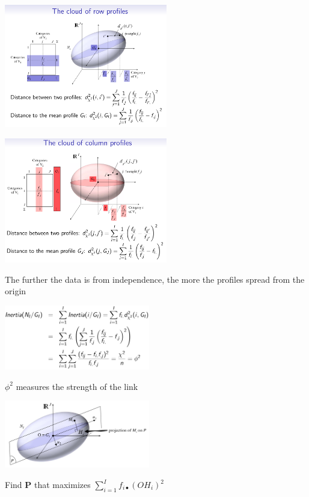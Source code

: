 \documentclass[10pt,landscape]{article}
\begin{document}
\begin{multicols*}{3}
\begin{minipage}{\linewidth}
    \centering
            \includegraphics[width=2.8in]{cloud_of_row_profiles.png}
        \end{minipage}
        
\begin{minipage}{\linewidth}
    \centering
            \includegraphics[width=2.8in]{cloud_of_column_profiles.png}
        \end{minipage}

The further the data is from independence, the more the profiles spread from the origin

\begin{minipage}{\linewidth}
    \centering
            \includegraphics[width=2.5in]{inertia_ca.png}
        \end{minipage}
\break

$\phi^2$ measures the strength of the link

\begin{minipage}{\linewidth}
    \centering
            \includegraphics[width=2.5in]{plane.png}
        \end{minipage}
\break
Find \textbf{P} that maximizes $\sum_{i=1}^{I}f_{i\bullet}(OH_i)^2$



\end{multicols*}
\end{document}
